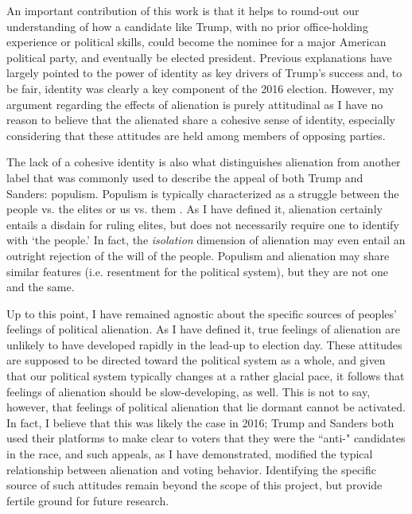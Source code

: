 \documentclass[12pt]{article}
\begin{document}
An important contribution of this work is that it helps to round-out our understanding of how a candidate like Trump, with no prior office-holding experience or political skills, could become the nominee for a major American political party, and eventually be elected president. Previous explanations have largely pointed to the power of identity as key drivers of Trump's success \parencite{sides2018identity} and, to be fair, identity was clearly a key component of the 2016 election. However, my argument regarding the effects of alienation is purely attitudinal as I have no reason to believe that the alienated share a cohesive sense of identity, especially considering that these attitudes are held among members of opposing parties.

The lack of a cohesive identity is also what distinguishes alienation from another label that was commonly used to describe the appeal of both Trump and Sanders: populism. Populism is typically characterized as a struggle between the people vs. the elites or us vs. them \parencite{Lee2019}. As I have defined it, alienation certainly entails a disdain for ruling elites, but does not necessarily require one to identify with `the people.' In fact, the \textit{isolation} dimension of alienation may even entail an outright rejection of the will of the people. Populism and alienation may share similar features (i.e. resentment for the political system), but they are not one and the same. 

Up to this point, I have remained agnostic about the specific sources of peoples' feelings of political alienation. As I have defined it, true feelings of alienation are unlikely to have developed rapidly in the lead-up to election day. These attitudes are supposed to be directed toward the political system as a whole, and given that our political system typically changes at a rather glacial pace, it follows that feelings of alienation should be slow-developing, as well. This is not to say, however, that feelings of political alienation that lie dormant cannot be activated. In fact, I believe that this was likely the case in 2016; Trump and Sanders both used their platforms to make clear to voters that they were the ``anti-" candidates in the race, and such appeals, as I have demonstrated, modified the typical relationship between  alienation and voting behavior. Identifying the specific source of such attitudes remain beyond the scope of this project, but provide fertile ground for future research. 
\end{document}
